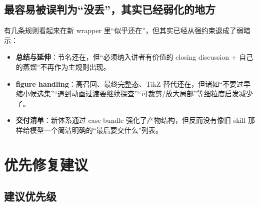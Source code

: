 \documentclass[a4paper]{article}
\begin{document}
\subsection{最容易被误判为“没丢”，其实已经弱化的地方}

有几条规则看起来在新 wrapper 里“似乎还在”，但其实已经从强约束退成了弱暗示：

\begin{itemize}
\item \textbf{总结与延伸}：节名还在，但“必须纳入讲者有价值的 closing discussion + 自己的蒸馏”不再作为主规则出现。
\item \textbf{figure handling}：高召回、最终完整态、TikZ 替代还在，但诸如“不要过早缩小候选集”“遇到动画过渡要继续探查”“可裁剪/放大局部”等细粒度启发减少了。
\item \textbf{交付清单}：新体系通过 case bundle 强化了产物结构，但反而没有像旧 skill 那样给模型一个简洁明确的“最后要交什么”列表。
\end{itemize}

\section{优先修复建议}

\subsection{建议优先级}
\end{document}
